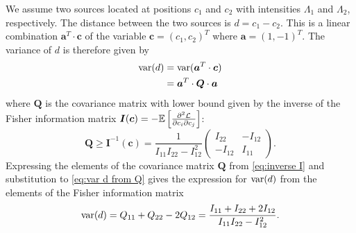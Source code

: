 We assume two sources located at positions $c_1$ and $c_2$ with intensities $\Lambda_1$ and $\Lambda_2$, respectively. The distance between the two sources is $d=c_1-c_2$. This is a linear combination $\bm{a}^{T}\cdot\bm{c}$ of the variable $\bm{c}=(c_1,c_2)^{T}$ where $\bm{a}=(1,-1)^{T}$. The variance of $d$ is therefore given by 
%
\begin{alignat}{1}
	\mathrm{var}(d)
	&=\mathrm{var}(\bm{a}^{T}\cdot\bm{c})\nonumber\\
	&=\bm{a}^{T}\cdot\bm{Q}\cdot\bm{a}
	\label{eq:var d from Q}
\end{alignat}
%
where $\bm{Q}$ is the covariance matrix with lower bound given by the inverse of the Fisher information matrix $\bm{I}(\bm{c})=-\mathbb{E}\left[\frac{\partial^2\mathcal{L}}{\partial c_i\partial c_j}\right]$: 
%
\begin{equation}
	\bm{Q}\geq\bm{I}^{-1}(\bm{c})=\frac{1}{I_{11}I_{22}-I_{12}^2}\left(
	\begin{array}{cc}
		I_{22} & -I_{12}\\
		-I_{12} & I_{11}
	\end{array}\right).
	\label{eq:inverse I}
\end{equation}
%
Expressing the elements of the covariance matrix $\bm{Q}$ from \autoref{eq:inverse I} and substitution to \autoref{eq:var d from Q} gives the expression for $\mathrm{var}(d)$ from the elements of the Fisher information matrix
%
\begin{equation}
	\mathrm{var}(d)=Q_{11}+Q_{22}-2Q_{12}=\frac{I_{11}+I_{22}+2I_{12}}{I_{11}I_{22}-I_{12}^2}.
	\label{eq:variance d alternative}
\end{equation}

